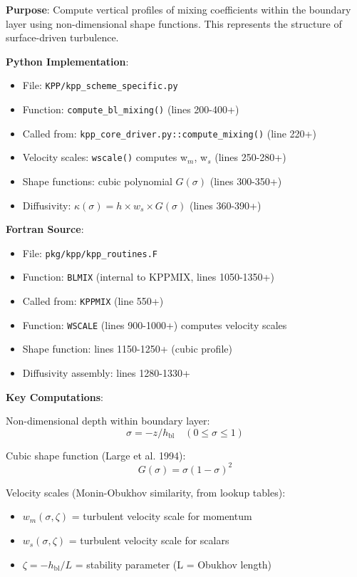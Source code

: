 \documentclass[11pt]{article}
\begin{document}
\textbf{Purpose}: Compute vertical profiles of mixing coefficients within the boundary layer using non-dimensional shape functions. This represents the structure of surface-driven turbulence.

\textbf{Python Implementation}:
\begin{itemize}
    \item File: \verb|KPP/kpp_scheme_specific.py|
    \item Function: \verb|compute_bl_mixing()| (lines 200-400+)
    \item Called from: \verb|kpp_core_driver.py::compute_mixing()| (line 220+)
    \item Velocity scales: \verb|wscale()| computes w$_m$, w$_s$ (lines 250-280+)
    \item Shape functions: cubic polynomial $G(\sigma)$ (lines 300-350+)
    \item Diffusivity: $\kappa(\sigma) = h \times w_s \times G(\sigma)$ (lines 360-390+)
\end{itemize}

\textbf{Fortran Source}:
\begin{itemize}
    \item File: \verb|pkg/kpp/kpp_routines.F|
    \item Function: \verb|BLMIX| (internal to KPPMIX, lines 1050-1350+)
    \item Called from: \verb|KPPMIX| (line 550+)
    \item Function: \verb|WSCALE| (lines 900-1000+) computes velocity scales
    \item Shape function: lines 1150-1250+ (cubic profile)
    \item Diffusivity assembly: lines 1280-1330+
\end{itemize}

\textbf{Key Computations}:

Non-dimensional depth within boundary layer:
\begin{equation}
\sigma = -z / h_{\text{bl}} \quad (0 \leq \sigma \leq 1)
\end{equation}

Cubic shape function (Large et al. 1994):
\begin{equation}
G(\sigma) = \sigma (1 - \sigma)^2
\end{equation}

Velocity scales (Monin-Obukhov similarity, from lookup tables):
\begin{itemize}
    \item $w_m(\sigma, \zeta)$ = turbulent velocity scale for momentum
    \item $w_s(\sigma, \zeta)$ = turbulent velocity scale for scalars
    \item $\zeta = -h_{\text{bl}} / L$ = stability parameter (L = Obukhov length)
\end{itemize}
\end{document}
